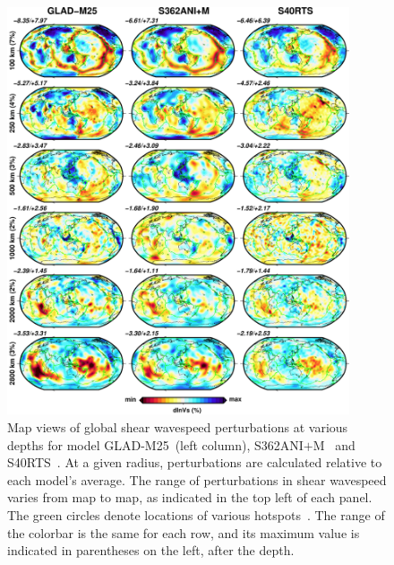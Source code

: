 \documentclass[extra,mreferee]{gji}
\begin{document}
\begin{figure}
  \centering
  \includegraphics[width=0.9\textwidth]{figures/depth_slice/globe_vs.pdf}
  \caption{Map views of global shear wavespeed perturbations at various depths for  model
  GLAD-M25~(left column), S362ANI$+$M~\citep[middle column;][]{moulik2014anisotropic}
  and S40RTS~\citep[right column;][]{ritsema2011s40rts}.
  At a given radius,
  perturbations are calculated relative to each model's average.
  The range of perturbations in shear wavespeed varies from map to map, as indicated in the top left of each panel.
  The green circles denote locations of various
  hotspots~\citep{montelli2006catalogue}.
  The range of the colorbar is the same for each row,
  and its maximum value is indicated in parentheses on the left, after
  the depth.}
  \label{fig:global-vs}
\end{figure}

\end{document}
